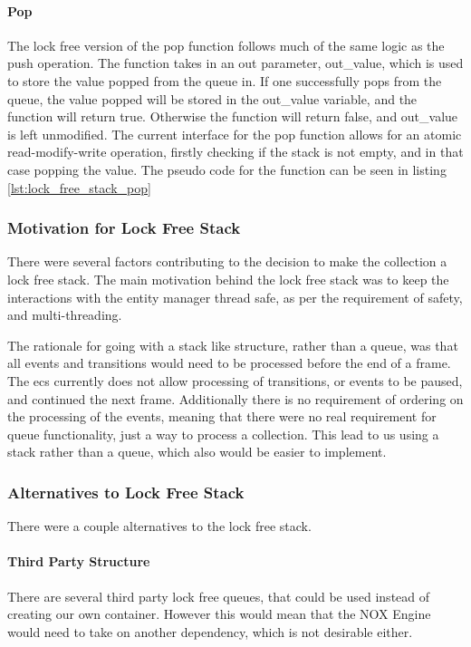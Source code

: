 \paragraph{Pop}
The lock free version of the pop function follows much of the same logic as the push operation.
The function takes in an out parameter, out\_value, which is used to store the value popped from the queue
in.
If one successfully pops from the queue, the value popped will be stored in the out\_value variable,
and the function will return true. Otherwise the function will return false, and out\_value is left
unmodified.
The current interface for the pop function allows for an atomic read-modify-write operation,
firstly checking if the stack is not empty, and in that case popping the value.
The pseudo code for the function can be seen in listing \ref{lst:lock_free_stack_pop}


\subsubsection{Motivation for Lock Free Stack}
There were several factors contributing to the decision to make the collection a lock free stack.
The main motivation behind the lock free stack was to keep the interactions with the entity manager thread safe,
as per the requirement of safety, and multi-threading.

The rationale for going with a stack like structure, rather than a queue, was that all events and transitions
would need to be processed before the end of a frame. The ecs currently does not allow processing of transitions,
or events to be paused, and continued the next frame. Additionally there is no requirement of ordering on the
processing of the events, meaning that there were no real requirement for queue functionality, just a way
to process a collection. This lead to us using a stack rather than a queue, which also would be easier to implement.

\subsubsection{Alternatives to Lock Free Stack}
There were a couple alternatives to the lock free stack.

\paragraph{Third Party Structure}
There are several third party lock free queues, that could be used instead of creating our own
container. However this would mean that the NOX Engine would need to take on another dependency,
which is not desirable either.

